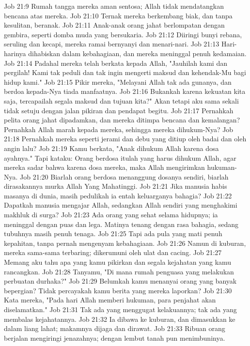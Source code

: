 Job 21:9  Rumah tangga mereka aman sentosa; Allah tidak mendatangkan bencana atas mereka.
Job 21:10  Ternak mereka berkembang biak, dan tanpa kesulitan, beranak.
Job 21:11  Anak-anak orang jahat berlompatan dengan gembira, seperti domba muda yang bersukaria.
Job 21:12  Diiringi bunyi rebana, seruling dan kecapi, mereka ramai bernyanyi dan menari-nari.
Job 21:13  Hari-harinya dihabiskan dalam kebahagiaan, dan mereka meninggal penuh kedamaian.
Job 21:14  Padahal mereka telah berkata kepada Allah, "Jauhilah kami dan pergilah! Kami tak peduli dan tak ingin mengerti maksud dan kehendak-Mu bagi hidup kami."
Job 21:15  Pikir mereka, "Melayani Allah tak ada gunanya, dan berdoa kepada-Nya tiada manfaatnya.
Job 21:16  Bukankah karena kekuatan kita saja, tercapailah segala maksud dan tujuan kita?" Akan tetapi aku sama sekali tidak setuju dengan jalan pikiran dan pendapat begitu.
Job 21:17  Pernahkah pelita orang jahat dipadamkan, dan mereka ditimpa bencana dan kemalangan? Pernahkah Allah marah kepada mereka, sehingga mereka dihukum-Nya?
Job 21:18  Pernahkah mereka seperti jerami dan debu yang ditiup oleh badai dan oleh angin lalu?
Job 21:19  Kamu berkata, "Anak dihukum Allah karena dosa ayahnya." Tapi kataku: Orang berdosa itulah yang harus dihukum Allah, agar mereka sadar bahwa karena dosa mereka, maka Allah mengirimkan hukuman-Nya.
Job 21:20  Biarlah orang berdosa menanggung dosanya sendiri, biarlah dirasakannya murka Allah Yang Mahatinggi.
Job 21:21  Jika manusia habis masanya di dunia, masih pedulikah ia entah keluarganya bahagia?
Job 21:22  Dapatkah manusia mengajar Allah, sedangkan Allah sendiri yang menghakimi makhluk di surga?
Job 21:23  Ada orang yang sehat selama hidupnya; ia meninggal dengan puas dan lega. Matinya tenang dengan rasa bahagia, sedang tubuhnya masih penuh tenaga.
Job 21:25  Tapi ada pula yang mati penuh kepahitan, tanpa pernah mengenyam kebahagiaan.
Job 21:26  Namun di kuburan, mereka sama-sama terbaring; dikerumuni oleh ulat dan cacing.
Job 21:27  Memang aku tahu apa yang kamu pikirkan dan segala kejahatan yang kamu rancangkan.
Job 21:28  Tanyamu, "Di mana rumah penguasa yang melakukan perbuatan durhaka?"
Job 21:29  Belumkah kamu menanyai orang yang banyak bepergian? Tidak percayakah kamu berita yang mereka laporkan?
Job 21:30  Kata mereka, "Pada hari Allah memberi hukuman, para penjahat akan diselamatkan."
Job 21:31  Tak ada yang menggugat kelakuannya; tak ada yang membalas kejahatannya.
Job 21:32  Ia dibawa ke kuburan, dan dimasukkan ke dalam liang lahat; makamnya dijaga dan dirawat.
Job 21:33  Ribuan orang berjalan mengiringi jenazahnya; dengan lembut tanah pun menimbuninya.
